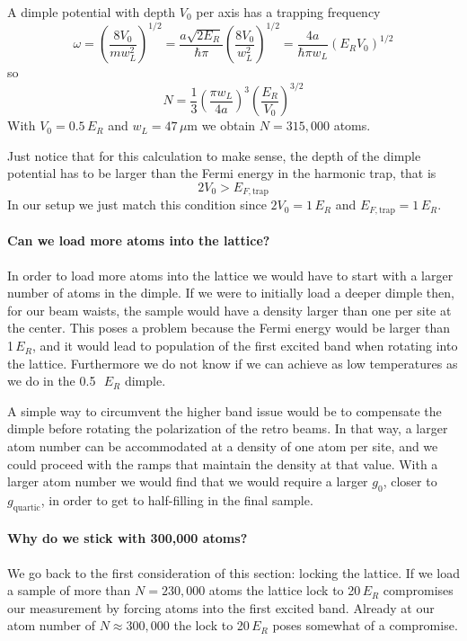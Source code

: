 \documentclass[11pt,letter]{article}
\begin{document}
A dimple potential with depth $V_{0}$ per axis has a trapping frequency 
\begin{equation}
  \omega  =  \left( \frac{8V_{0} } { mw_{L}^{2} } \right)^{1/2}
  =   \frac{ a \sqrt{2E_{R}} }{ \hbar \pi} 
   \left(  \frac{8V_{0} } { w_{L}^{2} } \right)^{1/2}
  =   \frac{ 4 a  }{ \hbar \pi w_{L} } 
   \left(  E_{R}V_{0}  \right)^{1/2}
\end{equation} 
so 
\begin{equation} 
 N = \frac{1}{3} 
  \left(  \frac{ \pi w_{L} }{ 4a} \right)^{3}  
  \left( \frac{ E_{R} }{V_{0}} \right)^{3/2} 
\end{equation}
With $V_{0} = 0.5\,E_{R}$ and $w_{L}=47\,\mu$m we obtain $N = 315,000$ atoms. 

Just notice that for this calculation to make sense, the depth of the dimple
potential has to be larger than the Fermi energy in the harmonic trap, that is 
\begin{equation}
  2 V_{0} >  E_{F,\text{trap}}
\end{equation} 
In our setup we just match this condition since $2V_{0}= 1\,E_{R}$ and
$E_{F,\text{trap}} = 1\,E_{R}$.  
 
\paragraph{Can we load more atoms into the lattice?}  In order to load more
atoms into the lattice we would have to start with a larger number of atoms in
the dimple.  If we were to initially load a deeper dimple then, for our beam
waists, the sample would have a density larger than one per site at the center.
This poses a problem because the Fermi energy would be larger than 1\,$E_{R}$,
and it would lead to population of the first excited band when rotating into
the lattice.  Furthermore we do not know if we can achieve as low
temperatures as we do in the 0.5~\,$E_{R}$ dimple.   

A simple way to circumvent the higher band issue would be to compensate the
dimple before rotating the polarization of the retro beams.  In that way, a
larger atom number can be accommodated at a density of one atom per site, and we
could proceed with the ramps that maintain the density at that value.  With a
larger atom number we would find that we would require a larger $g_{0}$, closer
to $g_{\text{quartic}}$, in order to get to half-filling in the final sample.  


\paragraph{Why do we stick with 300,000 atoms?}  We go back to the first
consideration of this section:  locking the lattice.   If we load a sample of
more than $N=230,000$ atoms the lattice lock to 20\,$E_{R}$ compromises our
measurement by forcing atoms into the first excited band.   Already at our atom
number of $N\approx 300,000$ the lock to 20\,$E_{R}$ poses somewhat of a
compromise.
\end{document}
